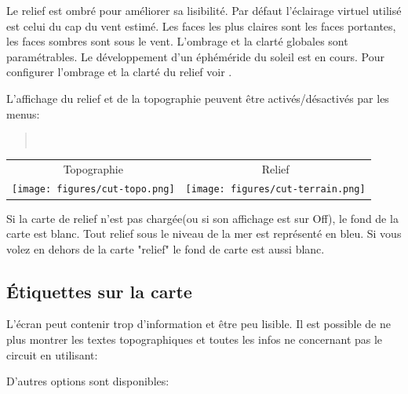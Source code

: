 Le relief est ombré pour améliorer sa lisibilité. Par défaut l'éclairage virtuel utilisé est celui du cap du vent estimé. Les faces les plus claires sont les faces portantes, les faces sombres sont sous le vent. L'ombrage et la clarté globales sont paramétrables. Le développement d'un éphéméride du soleil est en cours. Pour configurer l'ombrage et la clarté du relief voir .

L'affichage du relief et de la topographie peuvent être activés/désactivés par les menus:
\begin{quote}
\blink{} \\
\blink{}
\end{quote}

\begin{center}
\begin{tabular}{c c}
Topographie & Relief \\
\texttt{[image: figures/cut-topo.png]} &
\texttt{[image: figures/cut-terrain.png]} \\
\end{tabular}
\end{center}

Si la carte de relief n'est pas chargée(ou si son affichage est sur Off), le fond de la carte est blanc. Tout relief sous le niveau de la mer est représenté en bleu. Si vous volez en dehors de la carte "relief"  le fond de carte est aussi blanc.

\subsection*{Étiquettes sur la carte}\label{sec:maplabels}

L'écran peut contenir trop d'information et être peu lisible. Il est possible de ne plus montrer les textes  topographiques et toutes les infos ne concernant pas le circuit en utilisant:
\begin{quote}
\blink{}
\end{quote}

D'autres options sont disponibles:


